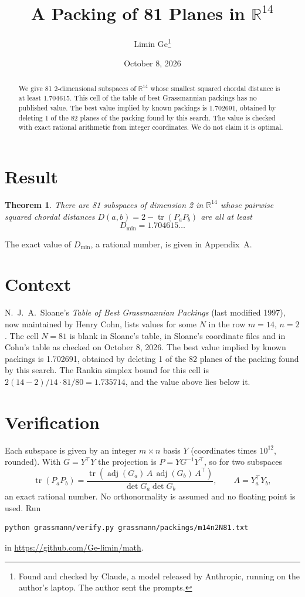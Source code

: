 \documentclass[11pt,a4paper]{article}
\title{A Packing of 81 Planes in $\mathbb{R}^{14}$}
\author{Limin Ge\thanks{Found and checked by Claude, a model released by Anthropic, running on the author's laptop. The author sent the prompts.}}
\date{October 8, 2026}
\newtheorem*{theorem}{Theorem}
\begin{document}
\maketitle
\begin{abstract}
We give 81 2-dimensional subspaces of $\mathbb{R}^{14}$ whose smallest squared chordal distance is at least 1.704615. This cell of the table of best Grassmannian packings has no published value. The best value implied by known packings is 1.702691, obtained by deleting 1 of the 82 planes of the packing found by this search. The value is checked with exact rational arithmetic from integer coordinates. We do not claim it is optimal.
\end{abstract}

\section{Result}
\begin{theorem}
There are 81 subspaces of dimension 2 in $\mathbb{R}^{14}$ whose pairwise squared chordal distances $D(a,b) = 2 - \operatorname{tr}(P_aP_b)$ are all at least
\[ D_{\min} = 1.704615\ldots \]
\end{theorem}
The exact value of $D_{\min}$, a rational number, is given in Appendix~A.


\section{Context}
N.~J.~A.~Sloane's \emph{Table of Best Grassmannian Packings} (last modified 1997), now maintained by Henry Cohn, lists values for some $N$ in the row $m=14$, $n=2$. The cell $N=81$ is blank in Sloane's table, in Sloane's coordinate files and in Cohn's table as checked on October 8, 2026. The best value implied by known packings is 1.702691, obtained by deleting 1 of the 82 planes of the packing found by this search. The Rankin simplex bound for this cell is $2(14-2)/14\cdot 81/80 = 1.735714$, and the value above lies below it.


\section{Verification}
Each subspace is given by an integer $m\times n$ basis $Y$ (coordinates times $10^{12}$, rounded). With $G=Y^\top Y$ the projection is $P=YG^{-1}Y^\top$, so for two subspaces
\[ \operatorname{tr}(P_aP_b)=\frac{\operatorname{tr}(\operatorname{adj}(G_a)\,A\,\operatorname{adj}(G_b)\,A^\top)}{\det G_a\det G_b},\qquad A=Y_a^\top Y_b, \]
an exact rational number. No orthonormality is assumed and no floating point is used. Run
\begin{verbatim}
python grassmann/verify.py grassmann/packings/m14n2N81.txt
\end{verbatim}
in \url{https://github.com/Ge-limin/math}.
\end{document}
